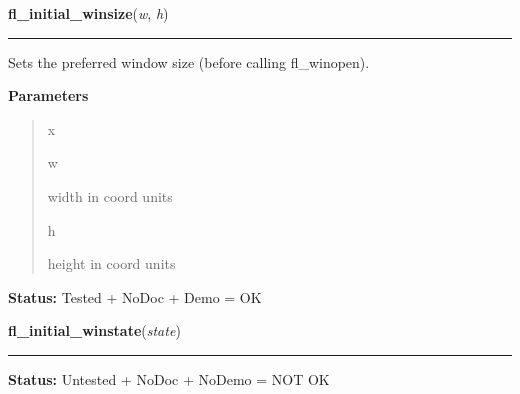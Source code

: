 \hspace{.8\funcindent}\begin{boxedminipage}{\funcwidth}

    \raggedright \textbf{fl\_initial\_winsize}(\textit{w}, \textit{h})

    \vspace{-1.5ex}

    \rule{\textwidth}{0.5\fboxrule}
\setlength{\parskip}{2ex}
    Sets the preferred window size (before calling fl\_winopen).

\setlength{\parskip}{1ex}
      \textbf{Parameters}
      \vspace{-1ex}

      \begin{quote}
        \begin{Ventry}{x}

          \item[w]

          width in coord units

          \item[h]

          height in coord units

        \end{Ventry}

      \end{quote}

\textbf{Status:} Tested + NoDoc + Demo = OK



    \end{boxedminipage}

    \label{xformslib:library:fl_initial_winstate}

    \vspace{0.5ex}

\hspace{.8\funcindent}\begin{boxedminipage}{\funcwidth}

    \raggedright \textbf{fl\_initial\_winstate}(\textit{state})

    \vspace{-1.5ex}

    \rule{\textwidth}{0.5\fboxrule}
\setlength{\parskip}{2ex}
\setlength{\parskip}{1ex}
\textbf{Status:} Untested + NoDoc + NoDemo = NOT OK



    \end{boxedminipage}

